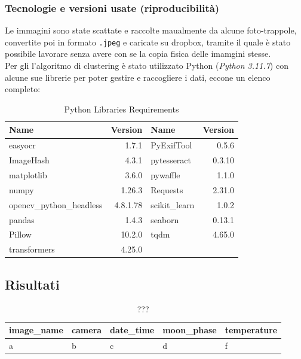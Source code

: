 \documentclass[12pt,a4paper,twoside]{article}
\begin{document}
\subsubsection{Tecnologie e versioni usate (riproducibilità)}
Le immagini sono state scattate e raccolte maualmente da alcune foto-trappole, convertite poi in 
formato \texttt{.jpeg} e caricate su dropbox, tramite il quale è stato possibile lavorare senza 
avere con se la copia fisica delle imamgini stesse.\\ 
Per gli l'algoritmo di clustering è stato utilizzato Python (\textit{Python 3.11.7}) con alcune 
sue librerie per poter gestire e raccogliere i dati, eccone un elenco completo:
\begin{table}[!ht]
    \centering
    \begin{tabular}{||l|r||l|r||}
        \hline
        \textbf{Name} & \textbf{Version} & \textbf{Name} & \textbf{Version} \\
        \hline
        easyocr & 1.7.1 & PyExifTool & 0.5.6 \\
        \hline
        ImageHash & 4.3.1 & pytesseract & 0.3.10 \\
        \hline
        matplotlib & 3.6.0 & pywaffle & 1.1.0 \\
        \hline
        numpy & 1.26.3 & Requests & 2.31.0 \\
        \hline
        opencv\_python\_headless & 4.8.1.78 & scikit\_learn & 1.0.2 \\
        \hline
        pandas & 1.4.3 & seaborn & 0.13.1 \\
        \hline
        Pillow & 10.2.0 & tqdm & 4.65.0 \\
        \hline
        transformers & 4.25.0 & & \\
        \hline
    \end{tabular}
    \caption{Python Libraries Requirements}
\end{table}

\subsection{Risultati}

\begin{table}[!ht]
    \centering
    \begin{tabular}{|l|l|l|l|l|}
        \hline
        \textbf{image\_name} & \textbf{camera} & \textbf{date\_time} & \textbf{moon\_phase} & \textbf{temperature} \\ 
        \hline
        a & b & c & d & f\\
        \hline
    \end{tabular}
    \caption{???}
\end{table}
\end{document}
